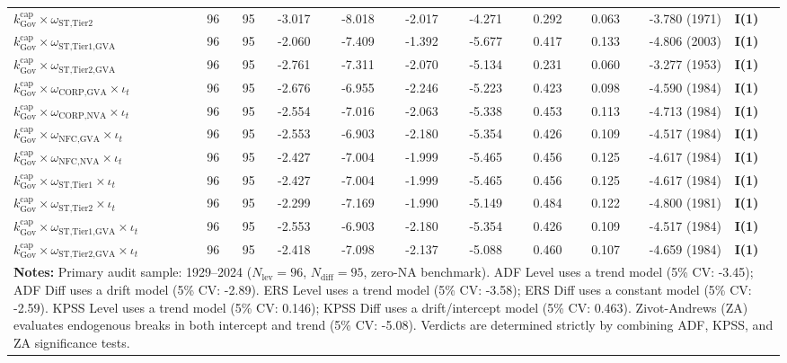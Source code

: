 \documentclass[11pt,a4paper]{article}
\begin{document}
\begin{landscape}
\begin{table}[p]
\begin{tabular}{p{6.0cm} p{0.6cm} p{0.6cm} p{1.5cm} p{1.5cm} p{1.5cm} p{1.5cm} p{1.5cm} p{1.5cm} p{2.2cm} p{2.2cm}}
$k^{\text{cap}}_{\text{Gov}} \times \omega_{\text{ST,Tier2}}$ & 96 & 95 & -3.017 & -8.018 & -2.017 & -4.271 & 0.292 & 0.063 & -3.780 (1971) & \textbf{I(1)} \\
$k^{\text{cap}}_{\text{Gov}} \times \omega_{\text{ST,Tier1,GVA}}$ & 96 & 95 & -2.060 & -7.409 & -1.392 & -5.677 & 0.417 & 0.133 & -4.806 (2003) & \textbf{I(1)} \\
$k^{\text{cap}}_{\text{Gov}} \times \omega_{\text{ST,Tier2,GVA}}$ & 96 & 95 & -2.761 & -7.311 & -2.070 & -5.134 & 0.231 & 0.060 & -3.277 (1953) & \textbf{I(1)} \\
$k^{\text{cap}}_{\text{Gov}} \times \omega_{\text{CORP,GVA}} \times \iota_t$ & 96 & 95 & -2.676 & -6.955 & -2.246 & -5.223 & 0.423 & 0.098 & -4.590 (1984) & \textbf{I(1)} \\
$k^{\text{cap}}_{\text{Gov}} \times \omega_{\text{CORP,NVA}} \times \iota_t$ & 96 & 95 & -2.554 & -7.016 & -2.063 & -5.338 & 0.453 & 0.113 & -4.713 (1984) & \textbf{I(1)} \\
$k^{\text{cap}}_{\text{Gov}} \times \omega_{\text{NFC,GVA}} \times \iota_t$ & 96 & 95 & -2.553 & -6.903 & -2.180 & -5.354 & 0.426 & 0.109 & -4.517 (1984) & \textbf{I(1)} \\
$k^{\text{cap}}_{\text{Gov}} \times \omega_{\text{NFC,NVA}} \times \iota_t$ & 96 & 95 & -2.427 & -7.004 & -1.999 & -5.465 & 0.456 & 0.125 & -4.617 (1984) & \textbf{I(1)} \\
$k^{\text{cap}}_{\text{Gov}} \times \omega_{\text{ST,Tier1}} \times \iota_t$ & 96 & 95 & -2.427 & -7.004 & -1.999 & -5.465 & 0.456 & 0.125 & -4.617 (1984) & \textbf{I(1)} \\
$k^{\text{cap}}_{\text{Gov}} \times \omega_{\text{ST,Tier2}} \times \iota_t$ & 96 & 95 & -2.299 & -7.169 & -1.990 & -5.149 & 0.484 & 0.122 & -4.800 (1981) & \textbf{I(1)} \\
$k^{\text{cap}}_{\text{Gov}} \times \omega_{\text{ST,Tier1,GVA}} \times \iota_t$ & 96 & 95 & -2.553 & -6.903 & -2.180 & -5.354 & 0.426 & 0.109 & -4.517 (1984) & \textbf{I(1)} \\
$k^{\text{cap}}_{\text{Gov}} \times \omega_{\text{ST,Tier2,GVA}} \times \iota_t$ & 96 & 95 & -2.418 & -7.098 & -2.137 & -5.088 & 0.460 & 0.107 & -4.659 (1984) & \textbf{I(1)} \\
\bottomrule
\multicolumn{11}{p{23.0cm}}{\footnotesize \textbf{Notes:} Primary audit sample: 1929--2024 ($N_{\text{lev}}=96$, $N_{\text{diff}}=95$, zero-NA benchmark). ADF Level uses a trend model (5\% CV: -3.45); ADF Diff uses a drift model (5\% CV: -2.89). ERS Level uses a trend model (5\% CV: -3.58); ERS Diff uses a constant model (5\% CV: -2.59). KPSS Level uses a trend model (5\% CV: 0.146); KPSS Diff uses a drift/intercept model (5\% CV: 0.463). Zivot-Andrews (ZA) evaluates endogenous breaks in both intercept and trend (5\% CV: -5.08). Verdicts are determined strictly by combining ADF, KPSS, and ZA significance tests.}
\end{tabular}
\end{table}
\end{landscape}
\end{document}
